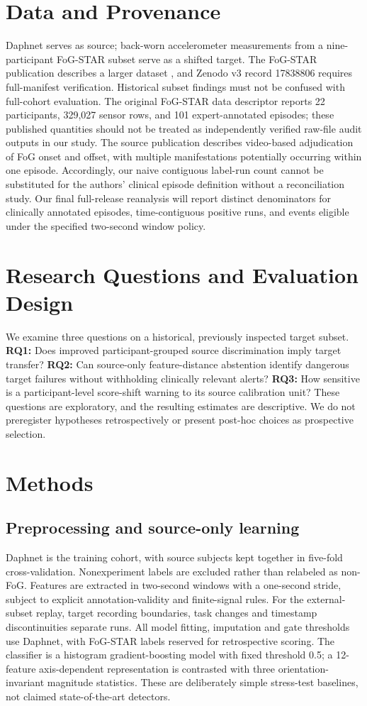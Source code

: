 \documentclass[sigconf,review,anonymous]{acmart}
\begin{document}
\section{Data and Provenance}
Daphnet serves as source; back-worn accelerometer measurements from a nine-participant FoG-STAR subset serve as a shifted target. The FoG-STAR publication describes a larger dataset \cite{fogstar2026}, and Zenodo v3 record 17838806 requires full-manifest verification. Historical subset findings must not be confused with full-cohort evaluation. The original FoG-STAR data descriptor reports 22 participants, 329{,}027 sensor rows, and 101 expert-annotated episodes; these published quantities should not be treated as independently verified raw-file audit outputs in our study. The source publication describes video-based adjudication of FoG onset and offset, with multiple manifestations potentially occurring within one episode. Accordingly, our naive contiguous label-run count cannot be substituted for the authors' clinical episode definition without a reconciliation study. Our final full-release reanalysis will report distinct denominators for clinically annotated episodes, time-contiguous positive runs, and events eligible under the specified two-second window policy.
\section{Research Questions and Evaluation Design}
We examine three questions on a historical, previously inspected target subset. \textbf{RQ1:} Does improved participant-grouped source discrimination imply target transfer? \textbf{RQ2:} Can source-only feature-distance abstention identify dangerous target failures without withholding clinically relevant alerts? \textbf{RQ3:} How sensitive is a participant-level score-shift warning to its source calibration unit? These questions are exploratory, and the resulting estimates are descriptive. We do not preregister hypotheses retrospectively or present post-hoc choices as prospective selection.

\section{Methods}
\subsection{Preprocessing and source-only learning}
Daphnet is the training cohort, with source subjects kept together in five-fold cross-validation. Nonexperiment labels are excluded rather than relabeled as non-FoG. Features are extracted in two-second windows with a one-second stride, subject to explicit annotation-validity and finite-signal rules. For the external-subset replay, target recording boundaries, task changes and timestamp discontinuities separate runs. All model fitting, imputation and gate thresholds use Daphnet, with FoG-STAR labels reserved for retrospective scoring. The classifier is a histogram gradient-boosting model with fixed threshold 0.5; a 12-feature axis-dependent representation is contrasted with three orientation-invariant magnitude statistics. These are deliberately simple stress-test baselines, not claimed state-of-the-art detectors.
\end{document}
